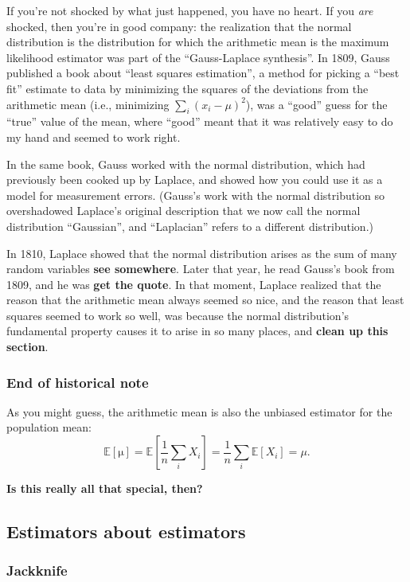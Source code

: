 \documentclass{book}
\begin{document}
If you're not shocked by what just happened, you have no heart. If you
\emph{are} shocked, then you're in good company: the realization that
the normal distribution is the distribution for which the arithmetic
mean is the maximum likelihood estimator was part of the ``Gauss-Laplace
synthesis''. In 1809, Gauss published a book about ``least squares
estimation'', a method for picking a ``best fit'' estimate to data by
minimizing the squares of the deviations from the arithmetic mean (i.e.,
minimizing \(\sum_i (x_i - \mu)^2\)), was a ``good'' guess for the
``true'' value of the mean, where ``good'' meant that it was relatively
easy to do my hand and seemed to work right.

In the same book, Gauss worked with the normal distribution, which had
previously been cooked up by Laplace, and showed how you could use it as
a model for measurement errors. (Gauss's work with the normal
distribution so overshadowed Laplace's original description that we now
call the normal distribution ``Gaussian'', and ``Laplacian'' refers to a
different distribution.)

In 1810, Laplace showed that the normal distribution arises as the sum
of many random variables \textbf{see somewhere}. Later that year, he
read Gauss's book from 1809, and he was \textbf{get the quote}. In that
moment, Laplace realized that the reason that the arithmetic mean always
seemed so nice, and the reason that least squares seemed to work so
well, was because the normal distribution's fundamental property causes
it to arise in so many places, and \textbf{clean up this section}.

\subsubsection{End of historical note}\label{end-of-historical-note}

As you might guess, the arithmetic mean is also the unbiased estimator
for the population mean: \[
\mathbb{E}[\mathrm{\mu}] = \mathbb{E}\left[\frac{1}{n} \sum_i X_i \right] = \frac{1}{n} \sum_i \mathbb{E}[X_i] = \mu.
\]

\textbf{Is this really all that special, then?}


\subsection{Estimators about
estimators}\label{estimators-about-estimators}

\subsubsection{Jackknife}\label{jackknife}
\end{document}
